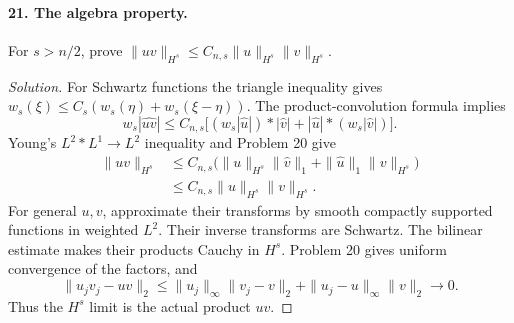 \paragraph{21. The algebra property.}
For $s>n/2$, prove
$\|uv\|_{H^s}\leq C_{n,s}\|u\|_{H^s}\|v\|_{H^s}$.
\begin{proof}[Solution]
For Schwartz functions the triangle inequality gives
$w_s(\xi)\leq C_s(w_s(\eta)+w_s(\xi-\eta))$.
The product-convolution formula implies
\[
 w_s|\widehat{uv}|\leq C_{n,s}
 \bigl[(w_s|\widehat u|)*|\widehat v|
       +|\widehat u|*(w_s|\widehat v|)\bigr].
\]
Young's $L^2*L^1\to L^2$ inequality and Problem 20 give
\[
 \begin{split}
 \|uv\|_{H^s}
 &\leq C_{n,s}\bigl(\|u\|_{H^s}\|\widehat v\|_1
                 +\|\widehat u\|_1\|v\|_{H^s}\bigr)\\
 &\leq C_{n,s}\|u\|_{H^s}\|v\|_{H^s}.
 \end{split}
\]
For general $u,v$, approximate their transforms by smooth compactly
supported functions in weighted $L^2$. Their inverse transforms are
Schwartz. The bilinear estimate makes their products Cauchy in $H^s$.
Problem 20 gives uniform convergence of the factors, and
\[
 \|u_jv_j-uv\|_2
 \leq\|u_j\|_\infty\|v_j-v\|_2
      +\|u_j-u\|_\infty\|v\|_2\to0.
\]
Thus the $H^s$ limit is the actual product $uv$.
\end{proof}
\Needspace{45mm}
